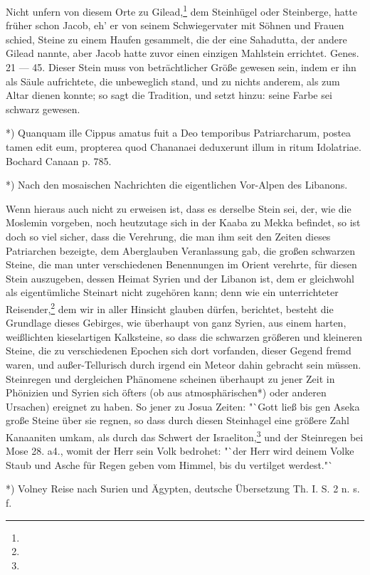 \documentclass[a4paper, 11pt, oneside, polutonikogreek, german]{article}
\begin{document}
Nicht unfern von diesem Orte zu Gilead,\footnote{} dem Steinhügel oder Steinberge, hatte früher schon Jacob, eh' er von seinem Schwiegervater mit Söhnen und Frauen schied, Steine zu einem Haufen gesammelt, die der eine Sahadutta, der andere Gilead nannte, aber Jacob hatte zuvor einen einzigen Mahlstein errichtet. Genes. 21 --- 45. Dieser Stein muss von beträchtlicher Größe gewesen sein, indem er ihn als Säule aufrichtete, die unbeweglich stand, und zu nichts anderem, als zum Altar dienen konnte; so sagt die Tradition, und setzt hinzu: seine Farbe sei schwarz gewesen.

*) Quanquam ille Cippus amatus fuit a Deo temporibus Patriarcharum, postea tamen edit eum, propterea quod Chananaei deduxerunt illum in ritum Idolatriae. Bochard Canaan p. 785.

*) Nach den mosaischen Nachrichten die eigentlichen Vor-Alpen des Libanons.

Wenn hieraus auch nicht zu erweisen ist, dass es derselbe Stein sei, der, wie die Moslemin vorgeben, noch heutzutage sich in der Kaaba zu Mekka befindet, so ist doch so viel sicher, dass die Verehrung, die man ihm seit den Zeiten dieses Patriarchen bezeigte, dem Aberglauben Veranlassung gab, die großen schwarzen Steine, die man unter verschiedenen Benennungen im Orient verehrte, für diesen Stein auszugeben, dessen Heimat Syrien und der Libanon ist, dem er gleichwohl als eigentümliche Steinart nicht zugehören kann; denn wie ein unterrichteter Reisender,\footnote{} dem wir in aller Hinsicht glauben dürfen, berichtet, besteht die Grundlage dieses Gebirges, wie überhaupt von ganz Syrien, aus einem harten, weißlichten kieselartigen Kalksteine, so dass die schwarzen größeren und kleineren Steine, die zu verschiedenen Epochen sich dort vorfanden, dieser Gegend fremd waren, und außer-Tellurisch durch irgend ein Meteor dahin gebracht sein müssen. Steinregen und dergleichen Phänomene scheinen überhaupt zu jener Zeit in Phönizien und Syrien sich öfters (ob aus atmosphärischen*) oder anderen Ursachen) ereignet zu haben. So jener zu Josua Zeiten: "`Gott ließ bis gen Aseka große Steine über sie regnen, so dass durch diesen Steinhagel eine größere Zahl Kanaaniten umkam, als durch das Schwert der Israeliton,\footnote{} und der Steinregen bei Mose 28. a4., womit der Herr sein Volk bedrohet: "`der Herr wird deinem Volke Staub und Asche für Regen geben vom Himmel, bis du vertilget werdest."`

*) Volney Reise nach Surien und Ägypten, deutsche Übersetzung Th. I. S. 2 n. s. f.
\end{document}
